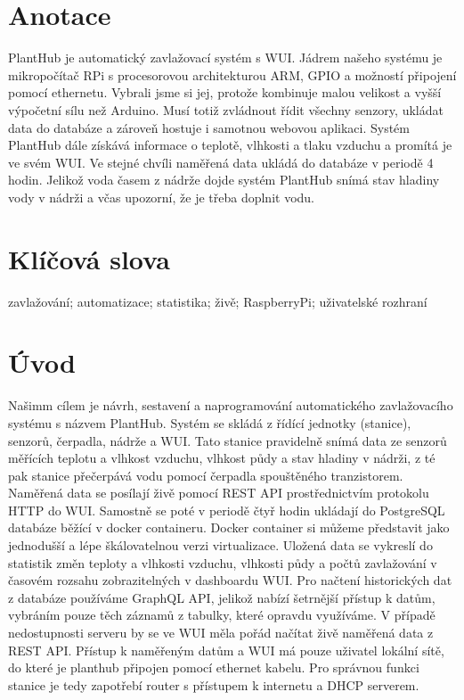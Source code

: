 \documentclass[12pt,a4paper]{article}
\begin{document}
\clearpage

\section*{Anotace}

PlantHub je automatický zavlažovací systém s \ac{WUI}.
Jádrem našeho systému je mikropočítač \ac{RPi} s procesorovou architekturou
\ac{ARM},
\ac{GPIO} a možností připojení pomocí ethernetu.
Vybrali jsme si jej, protože kombinuje malou velikost a vyšší výpočetní sílu
než Arduino. Musí totiž zvládnout řídit všechny senzory, ukládat data do
databáze a zároveň hostuje i samotnou webovou aplikaci. Systém PlantHub dále
získává informace o teplotě, vlhkosti a tlaku vzduchu a promítá je ve svém
\ac{WUI}. Ve stejné chvíli naměřená data ukládá do databáze v periodě 4
hodin. Jelikož voda časem z nádrže dojde systém PlantHub snímá stav hladiny
vody v nádrži a včas upozorní, že je třeba doplnit vodu.

\section*{Klíčová slova}

zavlažování; automatizace; statistika; živě; RaspberryPi; uživatelské rozhraní

\clearpage

\tableofcontents

\clearpage

\section{Úvod}

Našimm cílem je návrh, sestavení a naprogramování automatického zavlažovacího
systému s názvem PlantHub. Systém se skládá z řídící jednotky (stanice),
senzorů, čerpadla, nádrže a \ac{WUI}. Tato stanice pravidelně snímá data ze
senzorů
měřících
teplotu a vlhkost vzduchu, vlhkost půdy a stav hladiny v nádrži, z té pak
stanice přečerpává vodu pomocí čerpadla spouštěného tranzistorem. Naměřená
data
se posílají živě pomocí \ac{REST} \ac{API} prostřednictvím
protokolu HTTP do \ac{WUI}. Samostně se poté v periodě čtyř hodin ukládají do
PostgreSQL databáze běžící v docker
containeru. Docker container si můžeme představit jako jednodušší a lépe
škálovatelnou verzi
virtualizace. Uložená data se vykreslí do
statistik
změn teploty a vlhkosti vzduchu, vlhkosti půdy a počtů zavlažování v časovém
rozsahu zobrazitelných v dashboardu \ac{WUI}. Pro načtení historických dat z
databáze
používáme \ac{GraphQL} \ac{API}, jelikož nabízí šetrnější přístup k datům,
vybráním pouze
těch záznamů z tabulky, které opravdu využíváme. V případě nedostupnosti
serveru by se ve \ac{WUI} měla pořád načítat živě naměřená data z \ac{REST}
\ac{API}. Přístup
k naměřeným datům a
\ac{WUI} má pouze
uživatel lokální
sítě, do které je planthub připojen pomocí ethernet kabelu. Pro správnou funkci
stanice je tedy zapotřebí router s přístupem k internetu a DHCP serverem.
\end{document}

